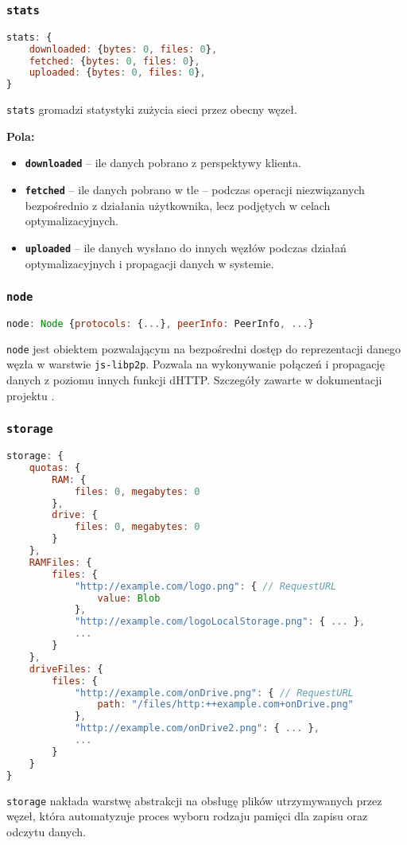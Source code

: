 % 

\subsubsection{\texttt{stats}}
\begin{lstlisting}[language=javascript]
stats: {
    downloaded: {bytes: 0, files: 0},
    fetched: {bytes: 0, files: 0},
    uploaded: {bytes: 0, files: 0},
}
\end{lstlisting}
\texttt{stats} gromadzi statystyki zużycia sieci przez obecny węzeł.

\textbf{Pola:}
\begin{itemize}
    \item \textbf{\texttt{downloaded}} -- ile danych pobrano z perspektywy klienta.
    \item \textbf{\texttt{fetched}} -- ile danych pobrano w tle -- podczas operacji niezwiązanych bezpośrednio z działania użytkownika, lecz podjętych w celach optymalizacyjnych.
    \item \textbf{\texttt{uploaded}} -- ile danych wysłano do innych węzłów podczas działań optymalizacyjnych i propagacji danych w systemie.
\end{itemize}

% 

\subsubsection{\texttt{node}}
\begin{lstlisting}[language=javascript]
    node: Node {protocols: {...}, peerInfo: PeerInfo, ...}
\end{lstlisting}
\texttt{node} jest obiektem pozwalającym na bezpośredni dostęp do reprezentacji danego węzła w warstwie \texttt{js-libp2p}. Pozwala na wykonywanie połączeń i propagację danych z poziomu innych funkcji dHTTP. Szczegóły zawarte w dokumentacji projektu \cite{libp2pReadme}.

% 

\subsubsection{\texttt{storage}}
\begin{lstlisting}[language=javascript]
storage: {
    quotas: {
        RAM: {
            files: 0, megabytes: 0
        },
        drive: {
            files: 0, megabytes: 0
        }
    },
    RAMFiles: {
        files: {
            "http://example.com/logo.png": { // RequestURL
                value: Blob
            },
            "http://example.com/logoLocalStorage.png": { ... },
            ...
        }
    },
    driveFiles: {
        files: {
            "http://example.com/onDrive.png": { // RequestURL
                path: "/files/http:++example.com+onDrive.png"
            },
            "http://example.com/onDrive2.png": { ... },
            ...
        }
    }
}
\end{lstlisting}
\texttt{storage} nakłada warstwę abstrakcji na obsługę plików utrzymywanych przez węzeł, która automatyzuje proces wyboru rodzaju pamięci dla zapisu oraz odczytu danych.

